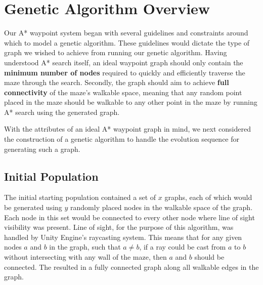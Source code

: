 \section{Genetic Algorithm Overview}
	Our A* waypoint system began with several guidelines and constraints around which to model a genetic algorithm. These guidelines would dictate the type of graph we wished to achieve from running our genetic algorithm. Having understood A* search itself, an ideal waypoint graph should only contain the \textbf{minimum number of nodes} required to quickly and efficiently traverse the maze through the search. Secondly, the graph should aim to achieve \textbf{full connectivity} of the maze's walkable space, meaning that any random point placed in the maze should be walkable to any other point in the maze by running A* search using the generated graph.
	
	With the attributes of an ideal A* waypoint graph in mind, we next considered the construction of a genetic algorithm to handle the evolution sequence for generating such a graph.
	
	\subsection{Initial Population}
	The initial starting population contained a set of \(x\) graphs, each of which would be generated using \(y\) randomly placed nodes in the walkable space of the graph. Each node in this set would be connected to every other node where line of sight visibility was present. Line of sight, for the purpose of this algorithm, was handled by Unity Engine's raycasting system. This means that for any given nodes \(a\) and \(b\) in the graph, such that \(a \neq b\), if a ray could be cast from \(a\) to \(b\) without intersecting with any wall of the maze, then \(a\) and \(b\) should be connected. The resulted in a fully connected graph along all walkable edges in the graph.
	
